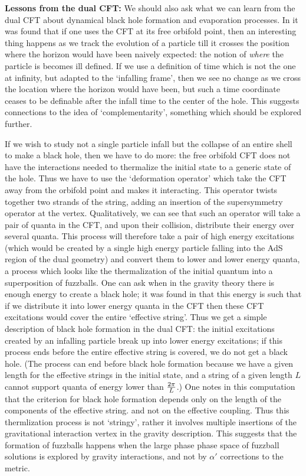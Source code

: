 \documentclass[12pt]{article}
\begin{document}
\b

{\bf Lessons from the dual CFT:} \quad We should also ask what we can learn from the dual CFT about dynamical  black hole formation and evaporation processes. In \cite{compmathur} it was found that if one uses the CFT at its free orbifold point, then an interesting thing happens as we track the evolution of a particle till it crosses the position where the horizon would have been naively expected: the notion of {\it where} the particle is becomes ill defined. If we use a definition of time which is not the one at infinity, but adapted to the `infalling frame', then we see no change as we cross the location where the horizon would have been, but such a time coordinate ceases to be definable after the infall time to the center of the hole. This suggests connections to the idea of `complementarity', something which should be explored further.

If we wish to study not a single particle infall but the collapse of an entire shell to make a black hole, then we have to do more: the free orbifold CFT does not have the interactions needed to thermalize the 
initial state to a generic state of the hole. Thus we have to use the `deformation operator' which take the CFT away from the orbifold point and makes it interacting. This operator twists together two strands of the string, adding an insertion of the supersymmetry operator at the vertex. Qualitatively, we can see that such an operator will take a pair of quanta in the CFT, and upon their collision, distribute their energy over several quanta. This process will therefore take a pair of high energy excitations (which would be created by a single high energy particle falling into the AdS region of the dual geometry) and convert them to lower and lower energy quanta, a process which looks like the thermalization of the initial quantum into a superposition of fuzzballs. One can ask when in the gravity theory there is enough energy to create a black hole; it was found in \cite{lm4} that this energy is such that if we distribute it into lower energy quanta in the CFT then these CFT excitations would cover the entire `effective string'.  Thus we get a simple description of black hole formation in the dual CFT: the initial excitations created by an infalling particle break up into lower energy excitations; if this process ends before the entire effective string is covered, we do not get a black hole. (The process can end before black hole formation because we have a given length for the effective strings in the initial state, and a string of a given length $L$ cannot support quanta of energy lower  than ${2\pi\over L}$.) One notes in this computation that the criterion for black hole formation depends only on the length of the components of the effective string. and not on the effective coupling. Thus this thermlization process is not `stringy', rather it involves multiple insertions of the gravitational interaction vertex in the gravity description. This suggests that the formation of fuzzballs happens when the large phase phase space of fuzzball solutions is explored by gravity interactions, and not by $\alpha'$ corrections to the metric.
\end{document}
